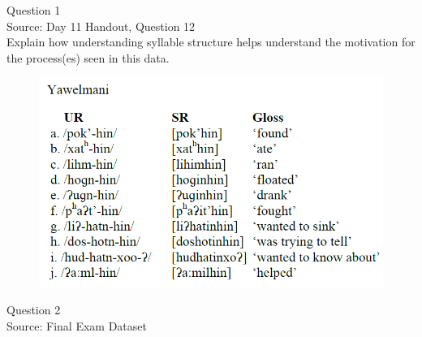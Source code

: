 \documentclass[12pt]{article}
\begin{document}
\begin{center}
\textbf{{\color{violet}{\HUGE Wednesday, 24 June 2020\\}}}

\textbf{{\color{violet}{\HUGE ALL EXAMS\\}}}

\end{center}
\newpage

\begin{center}
\textbf{{\color{blue}{\HUGE START OF EXAM\\}}}

\textbf{{\color{blue}{\HUGE Student ID: 3684\\}}}

\textbf{{\color{blue}{\HUGE 9:30 - 9:50 AM\\}}}

\end{center}
\newpage

{\large Question 1}\\

Source: Day 11 Handout, Question 12\\

Explain how understanding syllable structure helps understand the motivation for the process(es) seen in this data.\\

\begin{figure}[H]
\includegraphics{../images/yawelmani.png}
\end{figure}

\newpage

{\large Question 2}\\

Source: Final Exam Dataset\\
\end{document}
